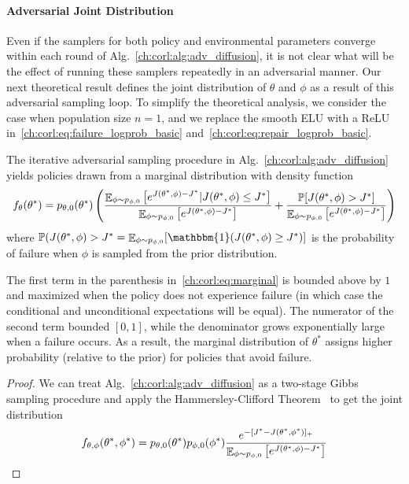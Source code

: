 {\paragraph{Adversarial Joint Distribution} Even if the samplers for both policy and environmental parameters converge within each round of Alg.~\ref{ch:corl:alg:adv_diffusion}, it is not clear what will be the effect of running these samplers repeatedly in an adversarial manner. Our next theoretical result defines the joint distribution of $\theta$ and $\phi$ as a result of this adversarial sampling loop. To simplify the theoretical analysis, we consider the case when population size $n=1$, and we replace the smooth ELU with a ReLU in~\eqref{ch:corl:eq:failure_logprob_basic} and~\eqref{ch:corl:eq:repair_logprob_basic}.

\begin{theorem}\label{ch:corl:thm:joint}
    The iterative adversarial sampling procedure in Alg.~\ref{ch:corl:alg:adv_diffusion} yields policies drawn from a marginal distribution with density function
    \begin{equation}
        f_\theta(\theta^*) = p_{\theta, 0}(\theta^*) \left( \frac{\mathop{\mathbb{E}}_{\phi \sim p_{\phi, 0}}\left[ e^{J(\theta^*, \phi) - J^*} | J(\theta^*, \phi) \leq J^* \right]}{\mathop{\mathbb{E}}_{\phi \sim p_{\phi, 0}}\left[ e^{J(\theta^*, \phi) - J^*} \right]} +
            \frac{\mathbb{P}[J(\theta^*, \phi) > J^*]}{\mathop{\mathbb{E}}_{\phi \sim p_{\phi, 0}}\left[ e^{J(\theta^*, \phi) - J^*}\right]} \right)\label{ch:corl:eq:marginal}
    \end{equation}
    where $\mathbb{P}(J(\theta^*, \phi) > J^* = \expectation_{\phi \sim p_{\phi, 0}}[\mathbbm{1}(J(\theta^*, \phi) \geq J^*)]$ is the probability of failure when $\phi$ is sampled from the prior distribution.
\end{theorem}

The first term in the parenthesis in~\eqref{ch:corl:eq:marginal} is bounded above by $1$ and maximized when the policy does not experience failure (in which case the conditional and unconditional expectations will be equal). The numerator of the second term bounded $[0, 1]$, while the denominator grows exponentially large when a failure occurs. As a result, the marginal distribution of $\theta^*$ assigns higher probability (relative to the prior) for policies that avoid failure.

\begin{proof}
    We can treat Alg.~\ref{ch:corl:alg:adv_diffusion} as a two-stage Gibbs sampling procedure and apply the Hammersley-Clifford Theorem~\cite{robertMonteCarloStatistical2004} to get the joint distribution
    \begin{equation}
        f_{\theta, \phi}(\theta^*, \phi^*) = p_{\theta, 0}(\theta^*) p_{\phi, 0}(\phi^*) \frac{e^{-[J^* - J(\theta^*, \phi^*)]_+}}{\mathop{\mathbb{E}}_{\phi \sim p_{\phi, 0}}\left[ e^{J(\theta^*, \phi) - J^*} \right]} \label{ch:corl:eq:joint}
    \end{equation}


\end{proof}}
